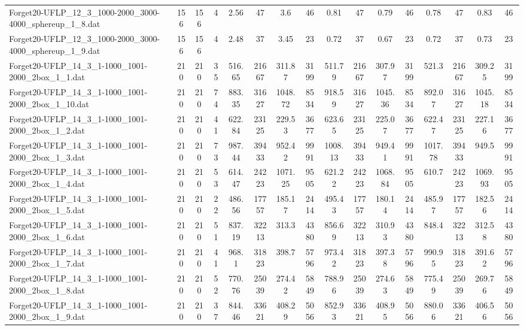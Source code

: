 \begin{sidewaystable}[!ht]
{\begin{tabular}{lccccccccccccccc}
Forget20-UFLP\_12\_3\_1000-2000\_3000-4000\_sphereup\_1\_8.dat & 156 & 156 & 4 & 2.56 & 47 & 3.6 & 46 & 0.81 & 47 & 0.79 & 46 &  \textcolor{blue2}{0.78} & 47 & 0.83 & 46 \\
Forget20-UFLP\_12\_3\_1000-2000\_3000-4000\_sphereup\_1\_9.dat & 156 & 156 & 4 & 2.48 & 37 & 3.45 & 23 & 0.72 & 37 &  \textcolor{blue2}{0.67} & 23 & 0.72 & 37 & 0.73 & 23 \\
Forget20-UFLP\_14\_3\_1-1000\_1001-2000\_2box\_1\_1.dat & 210 & 210 & 35 & 516.65 & 21667 & 311.87 & 3199 & 511.79 & 21667 & 307.97 & 3199 & 521.3 & 21667 & 309.25 & 3199 \\
Forget20-UFLP\_14\_3\_1-1000\_1001-2000\_2box\_1\_10.dat & 210 & 210 & 74 &  \textcolor{blue2}{883.35} & 31627 & 1048.72 & 8534 & 918.59 & 31627 & 1045.36 & 8534 & 892.07 & 31627 & 1045.18 & 8534 \\
Forget20-UFLP\_14\_3\_1-1000\_1001-2000\_2box\_1\_2.dat & 210 & 210 & 41 & 622.84 & 23125 & 229.53 & 3677 & 623.65 & 23125 &  \textcolor{blue2}{225.07} & 3677 & 622.47 & 23125 & 227.16 & 3677 \\
Forget20-UFLP\_14\_3\_1-1000\_1001-2000\_2box\_1\_3.dat & 210 & 210 & 73 & 987.44 & 39433 & 952.42 & 9991 & 1008.13 & 39433 & 949.41 & 9991 & 1017.78 & 39433 & 949.5 & 9991 \\
Forget20-UFLP\_14\_3\_1-1000\_1001-2000\_2box\_1\_4.dat & 210 & 210 & 53 & 614.47 & 24223 & 1071.25 & 9505 & 621.22 & 24223 & 1068.84 & 9505 &  \textcolor{blue2}{610.7} & 24223 & 1069.93 & 9505 \\
Forget20-UFLP\_14\_3\_1-1000\_1001-2000\_2box\_1\_5.dat & 210 & 210 & 22 & 486.56 & 17757 & 185.17 & 2414 & 495.43 & 17757 &  \textcolor{blue2}{180.14} & 2414 & 485.97 & 17757 & 182.56 & 2414 \\
Forget20-UFLP\_14\_3\_1-1000\_1001-2000\_2box\_1\_6.dat & 210 & 210 & 51 & 837.19 & 32213 & 313.3 & 4380 & 856.69 & 32213 & 310.93 & 4380 & 848.4 & 32213 & 312.58 & 4380 \\
Forget20-UFLP\_14\_3\_1-1000\_1001-2000\_2box\_1\_7.dat & 210 & 210 & 41 & 968.1 & 31823 & 398.7 & 5796 & 973.42 & 31823 & 397.38 & 5796 & 990.95 & 31823 &  \textcolor{blue2}{391.62} & 5796 \\
Forget20-UFLP\_14\_3\_1-1000\_1001-2000\_2box\_1\_8.dat & 210 & 210 & 52 & 770.76 & 25039 & 274.42 & 5849 & 788.96 & 25039 & 274.63 & 5849 & 775.49 & 25039 &  \textcolor{blue2}{269.76} & 5849 \\
Forget20-UFLP\_14\_3\_1-1000\_1001-2000\_2box\_1\_9.dat & 210 & 210 & 37 & 844.46 & 33621 & 408.29 & 5056 & 852.93 & 33621 & 408.95 & 5056 & 880.06 & 33621 & 406.56 & 5056 \\

\end{tabular}}
\end{sidewaystable}
